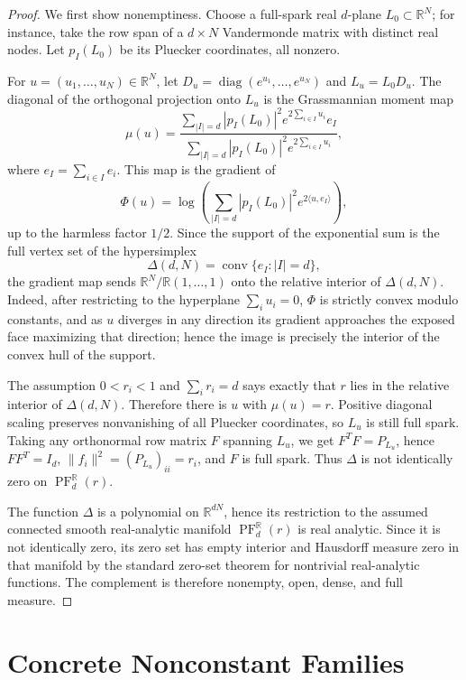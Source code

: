 \documentclass[11pt]{article}
\newcommand{\R}{\mathbb R}
\newcommand{\PF}{\operatorname{PF}}
\newcommand{\diag}{\operatorname{diag}}
\newcommand{\conv}{\operatorname{conv}}
\begin{document}
\begin{proof}
We first show nonemptiness. Choose a full-spark real \(d\)-plane \(L_0\subset \R^N\); for instance, take the row span of a \(d\times N\) Vandermonde matrix with distinct real nodes. Let \(p_I(L_0)\) be its Pluecker coordinates, all nonzero.

For \(u=(u_1,\ldots,u_N)\in\R^N\), let \(D_u=\diag(e^{u_1},\ldots,e^{u_N})\) and \(L_u=L_0D_u\). The diagonal of the orthogonal projection onto \(L_u\) is the Grassmannian moment map
\[
 \mu(u)
 =
 \frac{\sum_{|I|=d}|p_I(L_0)|^2 e^{2\sum_{i\in I}u_i} e_I}
      {\sum_{|I|=d}|p_I(L_0)|^2 e^{2\sum_{i\in I}u_i}},
\]
where \(e_I=\sum_{i\in I}e_i\). This map is the gradient of
\[
 \Phi(u)=\log\!\left(\sum_{|I|=d}|p_I(L_0)|^2 e^{2\langle u,e_I\rangle}\right),
\]
up to the harmless factor \(1/2\). Since the support of the exponential sum is the full vertex set of the hypersimplex
\[
 \Delta(d,N)=\conv\{e_I: |I|=d\},
\]
the gradient map sends \(\R^N/\R(1,\ldots,1)\) onto the relative interior of \(\Delta(d,N)\). Indeed, after restricting to the hyperplane \(\sum_i u_i=0\), \(\Phi\) is strictly convex modulo constants, and as \(u\) diverges in any direction its gradient approaches the exposed face maximizing that direction; hence the image is precisely the interior of the convex hull of the support.

The assumption \(0<r_i<1\) and \(\sum_i r_i=d\) says exactly that \(r\) lies in the relative interior of \(\Delta(d,N)\). Therefore there is \(u\) with \(\mu(u)=r\). Positive diagonal scaling preserves nonvanishing of all Pluecker coordinates, so \(L_u\) is still full spark. Taking any orthonormal row matrix \(F\) spanning \(L_u\), we get \(F^TF=P_{L_u}\), hence \(FF^T=I_d\), \(\|f_i\|^2=(P_{L_u})_{ii}=r_i\), and \(F\) is full spark. Thus \(\Delta\) is not identically zero on \(\PF_d^{\R}(r)\).

The function \(\Delta\) is a polynomial on \(\R^{dN}\), hence its restriction to the assumed connected smooth real-analytic manifold \(\PF_d^{\R}(r)\) is real analytic. Since it is not identically zero, its zero set has empty interior and Hausdorff measure zero in that manifold by the standard zero-set theorem for nontrivial real-analytic functions. The complement is therefore nonempty, open, dense, and full measure.
\end{proof}

\section{Concrete Nonconstant Families}
\end{document}
